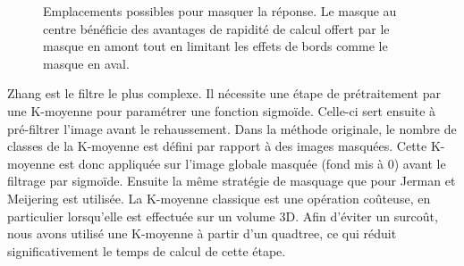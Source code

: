 \begin{figure}[!ht]

    \centering
      
\caption{Emplacements possibles pour masquer la réponse. Le masque au centre bénéficie des avantages de rapidité de calcul offert par le masque en amont tout en limitant les effets de bords comme le masque en aval.}
\label{fig:masks_posible_location}
\end{figure}

Zhang est le filtre le plus complexe. Il nécessite une étape de prétraitement par une K-moyenne pour paramétrer une fonction sigmoïde. Celle-ci sert ensuite à pré-filtrer l'image avant le rehaussement. Dans la méthode originale, le nombre de classes de la K-moyenne est défini par rapport à des images masquées. Cette K-moyenne est donc appliquée sur l'image globale masquée (fond mis à 0) avant le filtrage par sigmoïde. Ensuite la même stratégie de masquage que pour Jerman et Meijering est utilisée. La K-moyenne classique est une opération coûteuse, en particulier lorsqu'elle est effectuée sur un volume 3D. Afin d'éviter un surcoût, nous avons utilisé une K-moyenne à partir d'un quadtree, ce qui réduit significativement le temps de calcul de cette étape.

